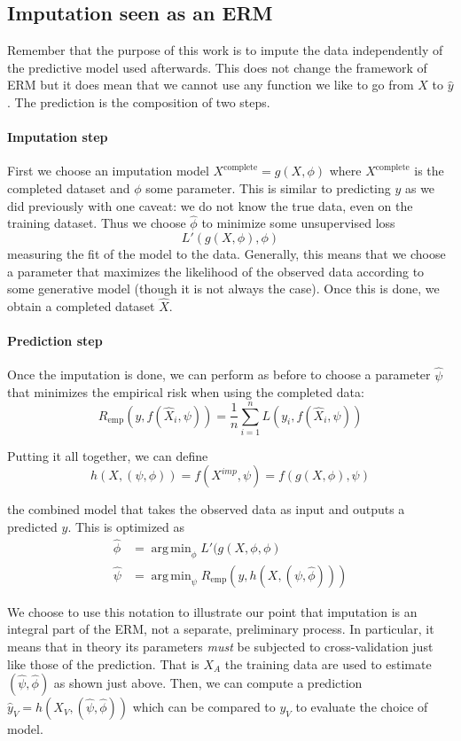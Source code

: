 \documentclass[12pt, a4paper]{memoir}
\DeclareMathOperator*{\argmin}{arg\,min}
\begin{document}
		\subsection{Imputation seen as an ERM}
Remember that the purpose of this work is to impute the data independently of the predictive model used afterwards. This does not change the framework of ERM but it does mean that we cannot use any function we like to go from $X$ to $\hat{y}$. The prediction is the composition of two steps.
			\paragraph{Imputation step}
First we choose an imputation model $X^{\text{complete}} = g(X, \phi)$ where $X^{\text{complete}}$ is the completed dataset and $\phi$ some parameter. This is similar to predicting $y$ as we did previously with one caveat: we do not know the true data, even on the training dataset. Thus we choose $\hat{\phi}$ to minimize some unsupervised loss
$$L'(g(X, \phi), \phi)$$
 measuring the fit of the model to the data. Generally, this means that we choose a parameter that maximizes the likelihood of the observed data according to some generative model (though it is not always the case). Once this is done, we obtain a completed dataset $\hat{X}$.

			\paragraph{Prediction step}
Once the imputation is done, we can perform as before to choose a parameter $\hat{\psi}$ that minimizes the empirical risk when using the completed data:
	$$ R_{\text{emp}}(y, f(\hat{X}_i, \psi)) = \frac{1}{n} \sum\limits_{i=1}^n L(y_i, f(\hat{X}_i, \psi))$$
	
Putting it all together, we can define 
$$ h(X, (\psi, \phi)) = f(X^{imp}, \psi) = f( g(X, \phi), \psi) $$

the combined model that takes the observed data as input and outputs a predicted $y$. This is optimized as 
\begin{align*}
\hat{\phi} &= \argmin_{\phi} L'(g(X,\phi, \phi) \\
\hat{\psi} &= \argmin_{\psi} R_{\text{emp}}(y, h(X, (\psi, \hat{\phi})))
\end{align*}

We choose to use this notation to illustrate our point that imputation is an integral part of the ERM, not a separate, preliminary process. In particular, it means that in theory its parameters \emph{must} be subjected to cross-validation just like those of the prediction. That is $X_A$ the training data are used to estimate $(\hat{\psi}, \hat{\phi})$ as shown just above. Then, we can compute a prediction $\hat{y}_V = h(X_V, (\hat{\psi}, \hat{\phi}))$ which can be compared to $y_V$ to evaluate the choice of model.
\end{document}
